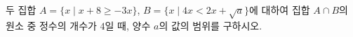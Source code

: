 두 집합 $A=\{x \mid x+8\ge -3x\}$, $B=\{x \mid 4x<2x+\sqrt{a}\}$에 대하여 집합 $A\cap B$의 원소 중 정수의 개수가 $4$일 때, 양수 $a$의 값의 범위를 구하시오.
